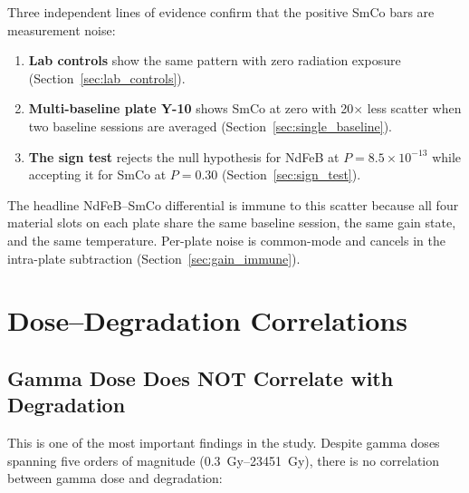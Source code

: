 \documentclass[11pt,letterpaper]{article}
\newcommand{\ndfeb}{NdFeB}
\newcommand{\smco}{SmCo}
\begin{document}
Three independent lines of evidence confirm that the positive \smco{} bars
are measurement noise:
\begin{enumerate}
    \item \textbf{Lab controls} show the same pattern with zero radiation
    exposure (Section~\ref{sec:lab_controls}).
    \item \textbf{Multi-baseline plate Y-10} shows \smco{} at zero with
    20$\times$ less scatter when two baseline sessions are averaged
    (Section~\ref{sec:single_baseline}).
    \item \textbf{The sign test} rejects the null hypothesis for \ndfeb{} at
    $P = 8.5 \times 10^{-13}$ while accepting it for \smco{} at $P = 0.30$
    (Section~\ref{sec:sign_test}).
\end{enumerate}
The headline \ndfeb{}--\smco{} differential is immune to this scatter because
all four material slots on each plate share the same baseline session, the
same gain state, and the same temperature.  Per-plate noise is common-mode
and cancels in the intra-plate subtraction
(Section~\ref{sec:gain_immune}).

\section{Dose--Degradation Correlations}
\label{sec:dose_degradation}

\subsection{Gamma Dose Does NOT Correlate with Degradation}

This is one of the most important findings in the study. Despite gamma doses
spanning five orders of magnitude (\SIrange{0.3}{23451}{Gy}), there is
no correlation between gamma dose and degradation:
\end{document}
